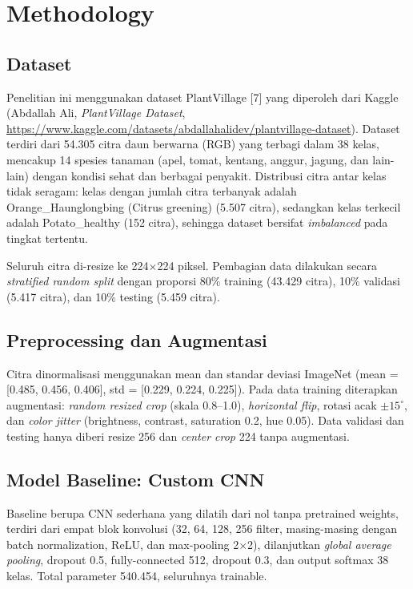 \documentclass[conference,a4paper]{IEEEtran}
\begin{document}
\section{Methodology}

\subsection{Dataset}
Penelitian ini menggunakan dataset PlantVillage [7] yang diperoleh dari Kaggle (Abdallah Ali, \emph{PlantVillage Dataset}, \url{https://www.kaggle.com/datasets/abdallahalidev/plantvillage-dataset}). Dataset terdiri dari 54.305 citra daun berwarna (RGB) yang terbagi dalam 38 kelas, mencakup 14 spesies tanaman (apel, tomat, kentang, anggur, jagung, dan lain-lain) dengan kondisi sehat dan berbagai penyakit. Distribusi citra antar kelas tidak seragam: kelas dengan jumlah citra terbanyak adalah Orange\_Haunglongbing (Citrus greening) (5.507 citra), sedangkan kelas terkecil adalah Potato\_healthy (152 citra), sehingga dataset bersifat \emph{imbalanced} pada tingkat tertentu.

Seluruh citra di-resize ke 224$\times$224 piksel. Pembagian data dilakukan secara \emph{stratified random split} dengan proporsi 80\% training (43.429 citra), 10\% validasi (5.417 citra), dan 10\% testing (5.459 citra).

\subsection{Preprocessing dan Augmentasi}
Citra dinormalisasi menggunakan mean dan standar deviasi ImageNet (mean = [0.485, 0.456, 0.406], std = [0.229, 0.224, 0.225]). Pada data training diterapkan augmentasi: \emph{random resized crop} (skala 0.8--1.0), \emph{horizontal flip}, rotasi acak $\pm 15^\circ$, dan \emph{color jitter} (brightness, contrast, saturation 0.2, hue 0.05). Data validasi dan testing hanya diberi resize 256 dan \emph{center crop} 224 tanpa augmentasi.

\subsection{Model Baseline: Custom CNN}
Baseline berupa CNN sederhana yang dilatih dari nol tanpa pretrained weights, terdiri dari empat blok konvolusi (32, 64, 128, 256 filter, masing-masing dengan batch normalization, ReLU, dan max-pooling 2$\times$2), dilanjutkan \emph{global average pooling}, dropout 0.5, fully-connected 512, dropout 0.3, dan output softmax 38 kelas. Total parameter 540.454, seluruhnya trainable.
\end{document}

